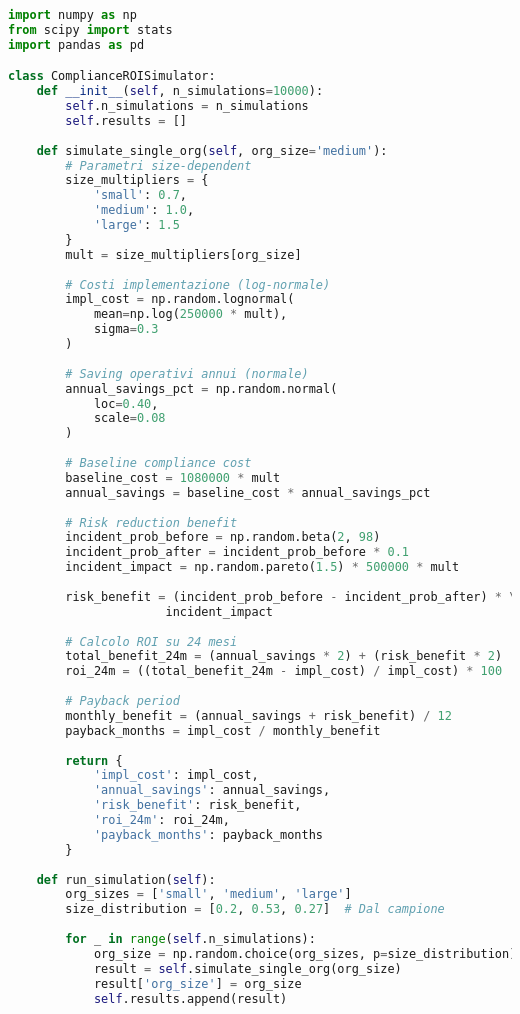 \begin{lstlisting}[language=Python, caption=Simulazione Monte Carlo per ROI Compliance]
import numpy as np
from scipy import stats
import pandas as pd

class ComplianceROISimulator:
    def __init__(self, n_simulations=10000):
        self.n_simulations = n_simulations
        self.results = []
        
    def simulate_single_org(self, org_size='medium'):
        # Parametri size-dependent
        size_multipliers = {
            'small': 0.7,
            'medium': 1.0,
            'large': 1.5
        }
        mult = size_multipliers[org_size]
        
        # Costi implementazione (log-normale)
        impl_cost = np.random.lognormal(
            mean=np.log(250000 * mult),
            sigma=0.3
        )
        
        # Saving operativi annui (normale)
        annual_savings_pct = np.random.normal(
            loc=0.40,
            scale=0.08
        )
        
        # Baseline compliance cost
        baseline_cost = 1080000 * mult
        annual_savings = baseline_cost * annual_savings_pct
        
        # Risk reduction benefit
        incident_prob_before = np.random.beta(2, 98)
        incident_prob_after = incident_prob_before * 0.1
        incident_impact = np.random.pareto(1.5) * 500000 * mult
        
        risk_benefit = (incident_prob_before - incident_prob_after) * \
                      incident_impact
        
        # Calcolo ROI su 24 mesi
        total_benefit_24m = (annual_savings * 2) + (risk_benefit * 2)
        roi_24m = ((total_benefit_24m - impl_cost) / impl_cost) * 100
        
        # Payback period
        monthly_benefit = (annual_savings + risk_benefit) / 12
        payback_months = impl_cost / monthly_benefit
        
        return {
            'impl_cost': impl_cost,
            'annual_savings': annual_savings,
            'risk_benefit': risk_benefit,
            'roi_24m': roi_24m,
            'payback_months': payback_months
        }
    
    def run_simulation(self):
        org_sizes = ['small', 'medium', 'large']
        size_distribution = [0.2, 0.53, 0.27]  # Dal campione
        
        for _ in range(self.n_simulations):
            org_size = np.random.choice(org_sizes, p=size_distribution)
            result = self.simulate_single_org(org_size)
            result['org_size'] = org_size
            self.results.append(result)
        

\end{lstlisting}
